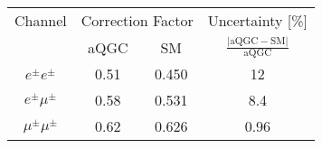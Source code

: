 \begin{tabular}{|c||c|c|c|}
\hline
Channel & \multicolumn{2}{c|}{Correction Factor} & Uncertainty [\%]\\
        & aQGC  & SM &  $\frac{|\textrm{aQGC}-\textrm{SM}|}{\textrm{aQGC}}$\\
\hline
\hline
$e^\pm e^\pm$& 0.51 & 0.450 & 12 \\ 
$e^\pm \mu^\pm$& 0.58 & 0.531 & 8.4 \\ 
$\mu^\pm \mu^\pm$& 0.62 & 0.626 & 0.96 \\ 
\hline
\end{tabular}
